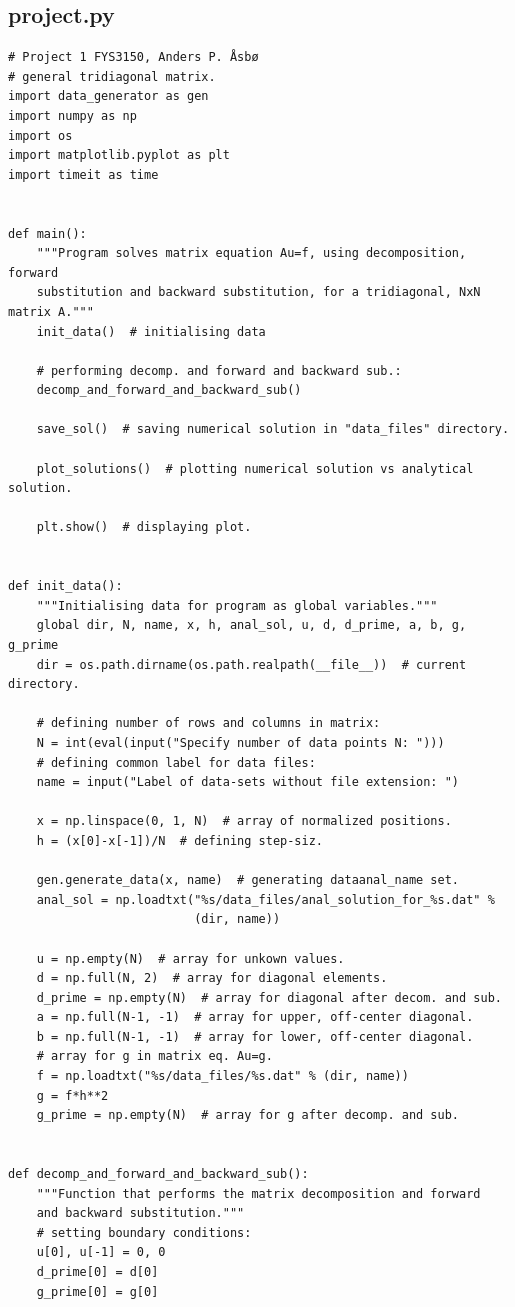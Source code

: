 \documentclass[english,notitlepage]{revtex4-1}  %
\begin{document}
\subsection{project.py}\label{A:1}
\begin{lstlisting}
# Project 1 FYS3150, Anders P. Åsbø
# general tridiagonal matrix.
import data_generator as gen
import numpy as np
import os
import matplotlib.pyplot as plt
import timeit as time


def main():
    """Program solves matrix equation Au=f, using decomposition, forward
    substitution and backward substitution, for a tridiagonal, NxN matrix A."""
    init_data()  # initialising data

    # performing decomp. and forward and backward sub.:
    decomp_and_forward_and_backward_sub()

    save_sol()  # saving numerical solution in "data_files" directory.

    plot_solutions()  # plotting numerical solution vs analytical solution.

    plt.show()  # displaying plot.


def init_data():
    """Initialising data for program as global variables."""
    global dir, N, name, x, h, anal_sol, u, d, d_prime, a, b, g, g_prime
    dir = os.path.dirname(os.path.realpath(__file__))  # current directory.

    # defining number of rows and columns in matrix:
    N = int(eval(input("Specify number of data points N: ")))
    # defining common label for data files:
    name = input("Label of data-sets without file extension: ")

    x = np.linspace(0, 1, N)  # array of normalized positions.
    h = (x[0]-x[-1])/N  # defining step-siz.

    gen.generate_data(x, name)  # generating dataanal_name set.
    anal_sol = np.loadtxt("%s/data_files/anal_solution_for_%s.dat" %
                          (dir, name))

    u = np.empty(N)  # array for unkown values.
    d = np.full(N, 2)  # array for diagonal elements.
    d_prime = np.empty(N)  # array for diagonal after decom. and sub.
    a = np.full(N-1, -1)  # array for upper, off-center diagonal.
    b = np.full(N-1, -1)  # array for lower, off-center diagonal.
    # array for g in matrix eq. Au=g.
    f = np.loadtxt("%s/data_files/%s.dat" % (dir, name))
    g = f*h**2
    g_prime = np.empty(N)  # array for g after decomp. and sub.


def decomp_and_forward_and_backward_sub():
    """Function that performs the matrix decomposition and forward
    and backward substitution."""
    # setting boundary conditions:
    u[0], u[-1] = 0, 0
    d_prime[0] = d[0]
    g_prime[0] = g[0]


\end{lstlisting}
\end{document}
